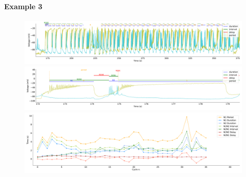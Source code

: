 \paragraph{\large{Example 3}}


\begin{figure}[htbp]
	\centering
	\begin{minipage}[b]{\textwidth}
		\centering
		\includegraphics[width=\textwidth,height=0.1\textheight]{./invariants/data/SUSSEX/CV1a_driven3/images/stim_cv1a3_signal_intervals_zoom.pdf}
		\includegraphics[width=\textwidth]{./invariants/data/SUSSEX/CV1a_driven3/images/stim_cv1a3_signal_intervals_cycle.pdf}
		\includegraphics[width=\textwidth]{./invariants/data/SUSSEX/CV1a_driven3/images/stim_cv1a3_time_cycle.pdf}
	\end{minipage}
	\centering
	\begin{minipage}[b]{0.43\textwidth}
		\centering

\end{minipage}
\end{figure}
